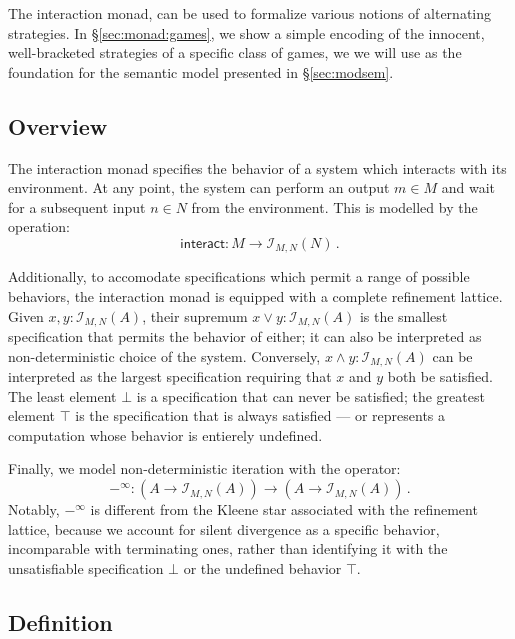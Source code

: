 \documentclass{article}
\newcommand{\kw}[1]{\ensuremath{ \mathsf{#1} }}
\begin{document}
The interaction monad,
can be used to formalize various notions of alternating strategies.
In \S\ref{sec:monad:games},
we show a simple encoding of the
innocent, well-bracketed strategies
of a specific class of games,
we we will use as the foundation for
the semantic model presented in \S\ref{sec:modsem}.


\subsection{Overview} \label{sec:monad:overview} %

The interaction monad specifies
the behavior of a system which interacts with its environment.
At any point,
the system can perform an output $m \in M$ and
wait for a subsequent input $n \in N$ from the environment.
This is modelled by the operation:
\[
    \kw{interact} : M \rightarrow \mathcal{I}_{M,N}(N) \,.
\]

Additionally,
to accomodate specifications which permit a range of possible behaviors,
the interaction monad is equipped with a complete refinement lattice.
Given $x, y : \mathcal{I}_{M,N}(A)$,
their supremum $x \vee y : \mathcal{I}_{M,N}(A)$
is the smallest specification that permits the behavior of either;
it can also be interpreted as non-deterministic choice
of the system.
Conversely, $x \wedge y : \mathcal{I}_{M,N}(A)$ can be interpreted as
the largest specification requiring that $x$ and $y$ both be satisfied.
The least element $\bot$
is a specification that can never be satisfied;
the greatest element $\top$
is the specification that is always satisfied ---
or represents a computation whose behavior is entierely undefined.

Finally,
we model non-deterministic iteration with the operator:
\[
     -^\infty : (A \rightarrow \mathcal{I}_{M,N}(A)) \rightarrow
                (A \rightarrow \mathcal{I}_{M,N}(A)) \,.
\]
Notably,
$-^\infty$ is different from
the Kleene star associated with the refinement lattice,
because we account for silent divergence as a specific behavior,
incomparable with terminating ones,
rather than identifying it with
the unsatisfiable specification $\bot$
or the undefined behavior $\top$.


\subsection{Definition} \label{sec:monad:def} %
\end{document}
